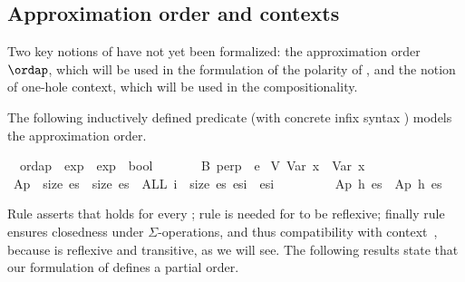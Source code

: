 \documentclass{llncs}
\newenvironment{isacode}
{\begin{list}{}{
\setlength{\leftmargin}{4pt}
\setlength{\rightmargin}{0pt}
\setlength{\listparindent}{0pt}\raggedright
\setlength{\itemsep}{0pt}
\setlength{\parsep}{0pt}
\normalfont\ttfamily }\item[]}
{\end{list}}
\begin{document}
\subsection{Approximation order and contexts}\label{subsect:ordapContx}

Two key notions of \crwl{} have not yet been formalized: the
approximation order $\ordap$, which will be used in the formulation of
the polarity of \crwl, and the notion of one-hole context, which will
be used in the compositionality.

The following inductively defined predicate  (with
concrete infix syntax \isaelem{\isasymsqsubseteq}) models the
approximation order.

\medskip

\begin{minipage}{\linewidth}
\begin{isacode}
\isamarkupfalse \isanewline
\ \ ordap\ {\isacharcolon}{\isacharcolon}\ {\isachardoublequoteopen}exp\ {\isasymRightarrow}\ exp\ {\isasymRightarrow}\ bool{\isachardoublequoteclose}\ {\isacharparenleft}{\isachardoublequoteopen}{\isacharunderscore}\ {\isasymsqsubseteq}\ {\isacharunderscore}{\isachardoublequoteclose}\ {\isacharbrackleft}{}{}{\isacharcomma}{}{}{\isacharbrackright}\ {}{}{\isacharparenright}\isanewline
{}\isanewline
\ \ B{\isacharcolon}\ {\isachardoublequoteopen}perp\ {\isasymsqsubseteq}\ e{\isachardoublequoteclose}\isanewline
{\isacharbar}\ V{\isacharcolon}\ {\isachardoublequoteopen}Var\ x\ {\isasymsqsubseteq}\ Var\ x{\isachardoublequoteclose}\isanewline
{\isacharbar}\ Ap{\isacharcolon}\ {\isachardoublequoteopen}{\isasymlbrakk}\ size\ es\ {\isacharequal}\ size\ es{\isacharprime}\ {\isacharsemicolon}\ ALL\ i\ {\isacharless}\ size\ es{\isachardot}\ es{\isacharbang}i\ {\isasymsqsubseteq}\ es{\isacharprime}{\isacharbang}i\ {\isasymrbrakk}\isanewline
\ \ \ \ \ \ \ {\isasymLongrightarrow}\ Ap\ h\ es\ {\isasymsqsubseteq}\ Ap\ h\ es{\isacharprime}{\isachardoublequoteclose}\end{isacode}
\end{minipage}


\medskip

\noindent Rule  asserts that 
holds for every ; rule  is needed for
\isaelem{\isasymsqsubseteq} to be reflexive; finally rule 
ensures closedness under $\Sigma$-operations, and thus compatibility
with context~\cite{BaaderNipkow-98}, because
\isaelem{\isasymsqsubseteq} is reflexive and transitive, as we will
see. The following results state that our formulation of
\isaelem{\isasymsqsubseteq} defines a partial order.
\end{document}
